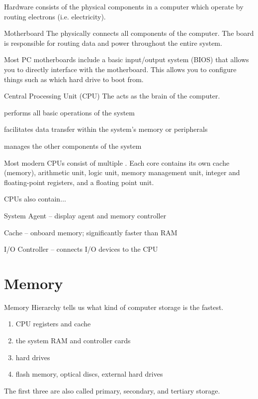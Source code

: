 \documentclass[12pt]{report}
\begin{document}
\begin{dfnbox}{Hardware}
	 consists of the physical components in a computer which operate by routing electrons (i.e. electricity).
\end{dfnbox}

\begin{dfnbox}{Motherboard}
	The  physically connects all components of the computer. The board is responsible for routing data and power throughout the entire system.
\end{dfnbox}

Most PC motherboards include a basic input/output system (BIOS) that allows you to directly interface with the motherboard. This allows you to configure things such as which hard drive to boot from.

\begin{dfnbox}{Central Processing Unit (CPU)}
	The  acts as the brain of the computer.
	\begin{dfnitems}
		\item performs all basic operations of the system
		\item facilitates data transfer within the system's memory or peripherals
		\item manages the other components of the system
	\end{dfnitems}
\end{dfnbox}

Most modern CPUs consist of multiple . Each core contains its own cache (memory), arithmetic unit, logic unit, memory management unit, integer and floating-point registers, and a floating point unit.
	
CPUs also contain$\ldots$
\begin{dfnitems}
	\item System Agent -- display agent and memory controller
	\item Cache -- onboard memory; significantly faster than RAM
	\item I/O Controller -- connects I/O devices to the CPU
\end{dfnitems}

\newpage
\chapter{Memory}
\begin{dfnbox}{Memory Hierarchy}
	 tells us what kind of computer storage is the fastest.
	
	\begin{enumerate}
		\item {} CPU registers and cache
		\item {} the system RAM and controller cards
		\item {} hard drives
		\item {} flash memory, optical discs, external hard drives
	\end{enumerate}

	The first three are also called primary, secondary, and tertiary storage.
\end{dfnbox}
\end{document}
